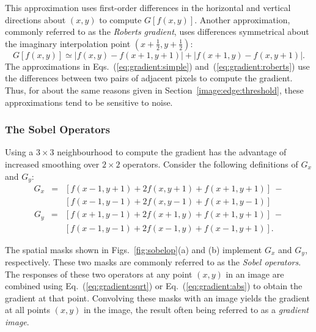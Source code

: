 This approximation uses first-order differences in the horizontal and
vertical directions about $(x,y)$ to compute $G[f(x,y)]$.  Another
approximation, commonly referred to as the {\em Roberts gradient\/},
uses differences symmetrical about the imaginary interpolation point
$(x+\frac{1}{2}, y+\frac{1}{2})$:
\begin{equation}
\label{eq:gradient:roberts}
  G[f(x,y)]\simeq|f(x,y)-f(x+1,y+1)|+|f(x+1,y)-f(x,y+1)|\mbox{.}
\end{equation}
The approximations in Eqs.~(\ref{eq:gradient:simple})
and~(\ref{eq:gradient:roberts}) use the differences between two pairs
of adjacent pixels to compute the gradient.  Thus, for about the same
reasons given in Section~\ref{image:edge:threshold}, these
approximations tend to be sensitive to noise.

\subsubsection{The Sobel Operators}

Using a $3\times 3$ neighbourhood to compute the gradient has the
advantage of increased smoothing over $2\times 2$ operators.  Consider
the following definitions of $G_{x}$ and $G_{y}$:
\begin{equation}
\label{eq:sobel:x}
  \begin{array}{lll}
    G_{x} & = & [f(x-1,y+1)+2f(x,y+1)+f(x+1,y+1)]\ - \\
          &   & [f(x-1,y-1)+2f(x,y-1)+f(x+1,y-1)]
  \end{array}
\end{equation}
\begin{equation}
\label{eq:sobel:y}
  \begin{array}{lll}
    G_{y} & = & [f(x+1,y-1)+2f(x+1,y)+f(x+1,y+1)]\ - \\
          &   & [f(x-1,y-1)+2f(x-1,y)+f(x-1,y+1)]\mbox{.}
  \end{array}
\end{equation}


The spatial masks shown in Figs.~\ref{fig:sobelop}(a) and (b)
implement $G_{x}$ and $G_{y}$, respectively.  These two masks are
commonly referred to as the {\em Sobel operators\/}.  The responses of
these two operators at any point $(x,y)$ in an image are combined
using Eq.~(\ref{eq:gradient:sqrt}) or Eq.~(\ref{eq:gradient:abs}) to
obtain the gradient at that point.  Convolving these masks with an
image yields the gradient at all points $(x,y)$ in the image, the
result often being referred to as a {\em gradient image\/}.

